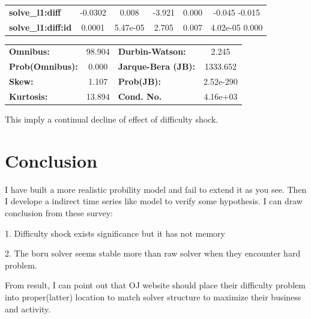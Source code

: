 \documentclass{article}
\begin{document}
\begin{center}
\begin{tabular}{lccccc}
\textbf{solve\_l1:diff}    &      -0.0302  &        0.008     &    -3.921  &         0.000        &        -0.045    -0.015       \\
\textbf{solve\_l1:diff:id} &       0.0001  &     5.47e-05     &     2.705  &         0.007        &      4.02e-05     0.000       \\
\bottomrule
\end{tabular}
\begin{tabular}{lclc}
\textbf{Omnibus:}       & 98.904 & \textbf{  Durbin-Watson:     } &     2.245  \\
\textbf{Prob(Omnibus):} &  0.000 & \textbf{  Jarque-Bera (JB):  } &  1333.652  \\
\textbf{Skew:}          &  1.107 & \textbf{  Prob(JB):          } & 2.52e-290  \\
\textbf{Kurtosis:}      & 13.894 & \textbf{  Cond. No.          } &  4.16e+03  \\
\bottomrule
\end{tabular}
\end{center}

This imply a continual decline of effect of difficulty shock.

\section{Conclusion}

I have built a more realistic probility model and fail to extend it as you see. 
Then I develope a indirect time series like model to verify some hypothesis. I can draw conclusion from these survey:

1. Difficulty shock exists significance but it has not memory 

2. The boru solver seems stable more than raw solver when they encounter hard problem.

From result, I can point out that OJ website should place their difficulty problem into proper(latter)
 location to match solver structure to maximize their business and activity.
\end{document}
